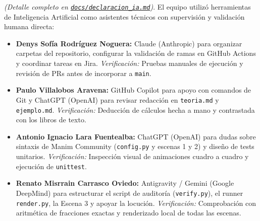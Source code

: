 \documentclass[10pt, a4paper]{article}
\begin{document}
\textit{(Detalle completo en \href{https://github.com/sofiarodrigueznog/EID-Grupo-3/blob/main/docs/declaracion_ia.md}{\texttt{docs/declaracion\_ia.md}})}. El equipo utilizó herramientas de Inteligencia Artificial como asistentes técnicos con supervisión y validación humana directa:
\begin{itemize}[leftmargin=1.5em, itemsep=2pt, topsep=2pt]
    \item \textbf{Denys Sofía Rodríguez Noguera:} Claude (Anthropic) para organizar carpetas del repositorio, configurar la validación de ramas en GitHub Actions y coordinar tareas en Jira. \textit{Verificación:} Pruebas manuales de ejecución y revisión de PRs antes de incorporar a \texttt{main}.
    \item \textbf{Paulo Villalobos Aravena:} GitHub Copilot para apoyo con comandos de Git y ChatGPT (OpenAI) para revisar redacción en \texttt{teoria.md} y \texttt{ejemplo.md}. \textit{Verificación:} Deducción de cálculos hecha a mano y contrastada con los libros de texto.
    \item \textbf{Antonio Ignacio Lara Fuentealba:} ChatGPT (OpenAI) para dudas sobre sintaxis de Manim Community (\texttt{config.py} y escenas 1 y 2) y diseño de tests unitarios. \textit{Verificación:} Inspección visual de animaciones cuadro a cuadro y ejecución de \texttt{unittest}.
    \item \textbf{Renato Misrrain Carrasco Oviedo:} Antigravity / Gemini (Google DeepMind) para estructurar el script de auditoría (\texttt{verify.py}), el runner \texttt{render.py}, la Escena 3 y apoyar la locución. \textit{Verificación:} Comprobación con aritmética de fracciones exactas y renderizado local de todas las escenas.
\end{itemize}
\end{document}
